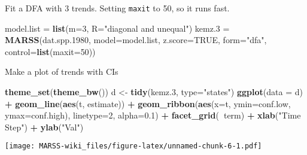 \documentclass[]{book}
\newenvironment{Shaded}{\begin{snugshade}}{\end{snugshade}}
\newcommand{\KeywordTok}[1]{\textcolor[rgb]{0.13,0.29,0.53}{\textbf{#1}}}
\newcommand{\DataTypeTok}[1]{\textcolor[rgb]{0.13,0.29,0.53}{#1}}
\newcommand{\DecValTok}[1]{\textcolor[rgb]{0.00,0.00,0.81}{#1}}
\newcommand{\FloatTok}[1]{\textcolor[rgb]{0.00,0.00,0.81}{#1}}
\newcommand{\StringTok}[1]{\textcolor[rgb]{0.31,0.60,0.02}{#1}}
\newcommand{\OtherTok}[1]{\textcolor[rgb]{0.56,0.35,0.01}{#1}}
\newcommand{\OperatorTok}[1]{\textcolor[rgb]{0.81,0.36,0.00}{\textbf{#1}}}
\newcommand{\NormalTok}[1]{#1}
\begin{document}
Fit a DFA with 3 trends. Setting \texttt{maxit} to 50, so it runs fast.

\begin{Shaded}
\begin{Highlighting}[]
\NormalTok{model.list =}\StringTok{ }\KeywordTok{list}\NormalTok{(}\DataTypeTok{m=}\DecValTok{3}\NormalTok{, }\DataTypeTok{R=}\StringTok{"diagonal and unequal"}\NormalTok{)}
\NormalTok{kemz.}\DecValTok{3}\NormalTok{ =}\StringTok{ }\KeywordTok{MARSS}\NormalTok{(dat.spp.}\DecValTok{1980}\NormalTok{, }\DataTypeTok{model=}\NormalTok{model.list,}
    \DataTypeTok{z.score=}\OtherTok{TRUE}\NormalTok{, }\DataTypeTok{form=}\StringTok{"dfa"}\NormalTok{, }\DataTypeTok{control=}\KeywordTok{list}\NormalTok{(}\DataTypeTok{maxit=}\DecValTok{50}\NormalTok{))}
\end{Highlighting}
\end{Shaded}

Make a plot of trends with CIs

\begin{Shaded}
\begin{Highlighting}[]
\KeywordTok{theme_set}\NormalTok{(}\KeywordTok{theme_bw}\NormalTok{())}
\NormalTok{d <-}\StringTok{ }\KeywordTok{tidy}\NormalTok{(kemz.}\DecValTok{3}\NormalTok{, }\DataTypeTok{type=}\StringTok{"states"}\NormalTok{)}
 \KeywordTok{ggplot}\NormalTok{(}\DataTypeTok{data =}\NormalTok{ d) }\OperatorTok{+}\StringTok{ }
\StringTok{   }\KeywordTok{geom_line}\NormalTok{(}\KeywordTok{aes}\NormalTok{(t, estimate)) }\OperatorTok{+}
\StringTok{   }\KeywordTok{geom_ribbon}\NormalTok{(}\KeywordTok{aes}\NormalTok{(}\DataTypeTok{x=}\NormalTok{t, }\DataTypeTok{ymin=}\NormalTok{conf.low, }\DataTypeTok{ymax=}\NormalTok{conf.high), }\DataTypeTok{linetype=}\DecValTok{2}\NormalTok{, }\DataTypeTok{alpha=}\FloatTok{0.1}\NormalTok{) }\OperatorTok{+}
\StringTok{   }\KeywordTok{facet_grid}\NormalTok{(}\OperatorTok{~}\NormalTok{term) }\OperatorTok{+}
\StringTok{   }\KeywordTok{xlab}\NormalTok{(}\StringTok{"Time Step"}\NormalTok{) }\OperatorTok{+}\StringTok{ }\KeywordTok{ylab}\NormalTok{(}\StringTok{"Val"}\NormalTok{)}
\end{Highlighting}
\end{Shaded}

\texttt{[image: MARSS-wiki\_files/figure-latex/unnamed-chunk-6-1.pdf]}


\end{document}
